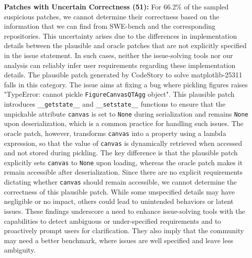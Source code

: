 \textbf{Patches with Uncertain Correctness (51):}
For 66.2\% of the sampled suspicious patches, we cannot determine their correctness based on the information that we can find from SWE-bench and the corresponding repositories.
This uncertainty arises due to the differences in implementation details between the plausible and oracle patches that are not explicitly specified in the issue statement. 
In such cases, neither the issue-solving tools nor our analysis can reliably infer user requirements regarding these implementation details. 
%
%
The plausible patch generated by CodeStory to solve matplotlib-25311 falls in this category.  
The issue aims at fixing a bug where pickling figures raises "TypeError: cannot pickle \verb|FigureCanvasQTAgg| object". 
This plausible patch introduces \verb|__getstate__| and \verb|__setstate__| functions to ensure that the unpickable attribute \verb|canvas| is set to \verb|None| during serialization and remains \verb|None| upon deserialization, which is a common practice for handling such issues. 
The oracle patch, however, transforms \verb|canvas| into a property using a lambda expression, so that the value of \verb|canvas| is dynamically retrieved when accessed and not stored during pickling. 
The key difference is that the plausible patch explicitly sets \verb|canvas| to \verb|None| upon loading, whereas the oracle patch makes it remain accessible after deserialization. 
Since there are no explicit requirements dictating whether \verb|canvas| should remain accessible, we cannot determine the correctness of this plausible patch. 
While some unspecified details may have negligible or no impact, others could lead to unintended behaviors or latent issues.
These findings underscore a need to enhance issue-solving tools with the capabilities to detect ambiguous or under-specified requirements and to proactively prompt users for clarification.
They also imply that the community may need a better benchmark, where issues are well specified and leave less ambiguity.

\vskip 1mm
\noindent {}
